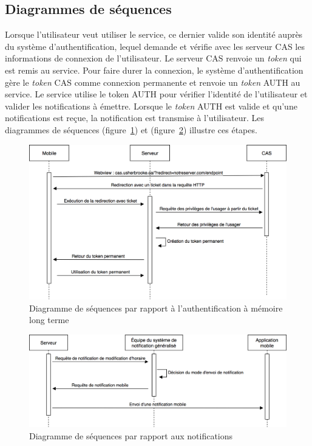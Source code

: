 	\subsection{Diagrammes de séquences}
	Lorsque l’utilisateur veut utiliser le service, ce dernier valide son identité auprès du système d'authentification, lequel demande et vérifie avec les serveur CAS les informations de connexion de l'utilisateur.  Le serveur CAS renvoie un \emph{token} qui est remis au service. Pour faire durer la connexion, le système d’authentification gère le \emph{token} CAS comme connexion permanente et renvoie un \emph{token} AUTH  au service. Le service utilise le token AUTH pour vérifier l’identité de l’utilisateur et valider les notifications à émettre. Lorsque le \emph{token} AUTH est valide et qu’une notifications est reçue, la notification est transmise à l’utilisateur. Les diagrammes de séquences (figure~\ref{fig.sequences_auth}) et (figure~\ref{fig.sequences_notif}) illustre ces étapes.

	\begin{figure}[hp]
		\centering
		\includegraphics[width=\textwidth]{Figures/Sequences_auth}
		\caption{Diagramme de séquences par rapport à l'authentification à mémoire long terme}
		\label{fig.sequences_auth}
	\end{figure}

	\begin{figure}[hp]
		\centering
		\includegraphics[width=\textwidth]{Figures/Sequences_notif}
		\caption{Diagramme de séquences par rapport aux notifications}
		\label{fig.sequences_notif}
	\end{figure}

